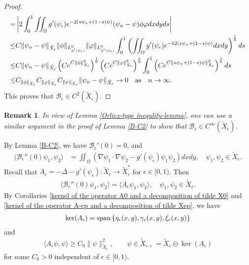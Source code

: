 \documentclass[1 [leqno, 11pt]{amsart}
\numberwithin{equation}{section}
\let\ep=\epsilon
\newtheorem{remark}[Theorem]{Remark}
\begin{document}
\begin{CJK*}{GBK}{song}
\begin{proof}
\begin{align*}
=&\left|2\int_0^1\iint_{\Omega}g'(\psi_\ep) e^{-2(s\psi_n + (1-s)\psi)}(\psi_n-\psi)\phi\varphi dxdyds\right|\\
\leq&C\|\psi_n-\psi\|_{\tilde X_\ep}\|\phi\|_{L_{g'(\psi_\ep)}^6}\|\varphi\|_{L_{g'(\psi_\ep)}^6}\int_0^1\left(\iint_{\Omega}g'(\psi_\ep) e^{-12(s\psi_n + (1-s)\psi)}dxdy\right)^{1\over6}ds\\
\leq&C\|\psi_n-\psi\|_{\tilde X_\ep}
\left(Ce^{C\|\phi\|_{\tilde X_\ep}^2}\right)^{1\over6}\left(Ce^{C\|\varphi\|_{\tilde X_\ep}^2}\right)^{1\over6}
\int_0^1\left(Ce^{C\|s\psi_n + (1-s)\psi\|_{\tilde X_\ep}^2}\right)^{1\over6}ds\\
\leq &C_{\|\phi\|_{\tilde X_\ep}}C_{\|\varphi\|_{\tilde X_\ep}}C_{\|\psi\|_{\tilde X_\ep}}\|\psi_n-\psi\|_{\tilde X_\ep}\to 0\quad \text{as}\quad n\to\infty.
\end{align*}
This proves that $\mathscr{B}_\ep\in C^2(\tilde X_\ep)$.
\end{proof}

\begin{remark}
In view of Lemma \ref{Orlicz-type inequlity-lemma}, one can use a similar argument in the proof of Lemma \ref{B-C2} to show that  $\mathscr{B}_\ep\in C^\infty(\tilde X_\ep)$.
\end{remark}

By Lemma \ref{B-C2}, we have $\mathscr{B}_\ep'(0) = 0$, and
\begin{align*}
\langle \mathscr{B}_\ep''(0)\psi_1,\psi_2 \rangle&=  \iint_{\Omega}\left(\nabla\psi_1\cdot\nabla\psi_2- g'(\psi_\ep) \psi_1\psi_2\right)dxdy,\quad \psi_1,\psi_2\in\tilde X_\ep.
\end{align*}
Recall that
$A_\ep =-\Delta -g'(\psi_\ep):\tilde{X}_\ep \rightarrow \tilde{X}_\ep^*$ for $\ep\in[0,1)$. Then
\begin{align}\label{B-ep-A-ep}
\langle \mathscr{B}_\ep''(0)\psi_1,\psi_2 \rangle=\langle A_\ep \psi_1,\psi_2 \rangle,\quad \psi_1,\psi_2\in\tilde X_\ep.
\end{align}
By Corollaries \ref{kernel of  the operator A0 and a decomposition of tilde X0} and \ref{kernel of  the operator A-ep and a decomposition of tilde Xep}, we have
\begin{align*}
\ker ( A_\ep)={\rm{span}}\left\{\eta_\ep(x,y), \gamma_\ep(x,y), \xi_\ep(x,y)\right\}
\end{align*}
and
\begin{align}\label{A-ep-positive-lower-bound}
\langle  A_\ep \psi,\psi\rangle \geq C_0 \| \psi\|_{\tilde X_\ep}^2, \quad \quad \psi\in \tilde X_{\ep+}=\tilde X_\ep \ominus\ker ( A_\ep)
\end{align}
for some $C_0>0$ independent of $\ep\in[0,1)$.


\end{CJK*}
\end{document}
